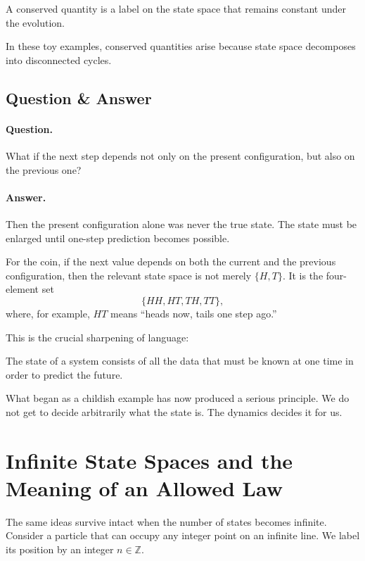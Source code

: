 \begin{definition}
A conserved quantity is a label on the state space that remains constant under the evolution.
\end{definition}

In these toy examples, conserved quantities arise because state space decomposes into disconnected cycles.

\subsection{Question \& Answer}

\paragraph{Question.} What if the next step depends not only on the present configuration, but also on the previous one?

\paragraph{Answer.} Then the present configuration alone was never the true state. The state must be enlarged until one-step prediction becomes possible.

For the coin, if the next value depends on both the current and the previous configuration, then the relevant state space is not merely \(\{H,T\}\). It is the four-element set
\[
\{HH,HT,TH,TT\},
\]
where, for example, \(HT\) means ``heads now, tails one step ago.''

This is the crucial sharpening of language:

\begin{definition}
The state of a system consists of all the data that must be known at one time in order to predict the future.
\end{definition}

What began as a childish example has now produced a serious principle. We do not get to decide arbitrarily what the state is. The dynamics decides it for us.

\section{Infinite State Spaces and the Meaning of an Allowed Law}

The same ideas survive intact when the number of states becomes infinite. Consider a particle that can occupy any integer point on an infinite line. We label its position by an integer \(n\in\mathbb{Z}\).

